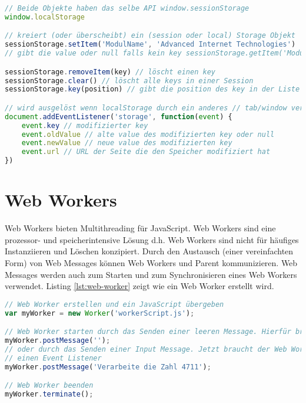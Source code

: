 \begin{lstlisting}[language=Javascript, caption=Web Storage, label=lst:web-storage]
// Beide Objekte haben das selbe API window.sessionStorage 
window.localStorage

// kreiert (oder überscheibt) ein (session oder local) Storage Objekt
sessionStorage.setItem('ModulName', 'Advanced Internet Technologies')
// gibt die value oder null falls kein key sessionStorage.getItem('ModulName')

sessionStorage.removeItem(key) // löscht einen key
sessionStorage.clear() // löscht alle keys in einer Session
sessionStorage.key(position) // gibt die position des key in der Liste

// wird ausgelöst wenn localStorage durch ein anderes // tab/window verändert wurde. Der name des events ist 'storage' 
document.addEventListener('storage', function(event) {
	event.key // modifizierter key
	event.oldValue // alte value des modifizierten key oder null
	event.newValue // neue value des modifizierten key
	event.url // URL der Seite die den Speicher modifiziert hat
})
\end{lstlisting}

\section{Web Workers}

Web Workers bieten Multithreading für JavaScript. Web Workers sind eine prozessor- und speicherintensive Lösung
d.h. Web Workers sind nicht für häufiges Instanziieren und Löschen konzipiert. Durch den Austausch (einer vereinfachten Form) von Web Messages können Web Workers und Parent kommunizieren. Web Messages werden auch zum Starten und zum Synchronisieren eines Web Workers verwendet. Listing \ref{lst:web-worker} zeigt wie ein Web Worker erstellt wird.

\begin{lstlisting}[language=Javascript, caption=Web Worker, label=lst:web-worker]
// Web Worker erstellen und ein JavaScript übergeben 
var myWorker = new Worker('workerScript.js');

// Web Worker starten durch das Senden einer leeren Message. Hierfür braucht der Web Worker keinen Event Listener 
myWorker.postMessage('');
// oder durch das Senden einer Input Message. Jetzt braucht der Web Worker 
// einen Event Listener
myWorker.postMessage('Verarbeite die Zahl 4711');

// Web Worker beenden
myWorker.terminate();
\end{lstlisting}
